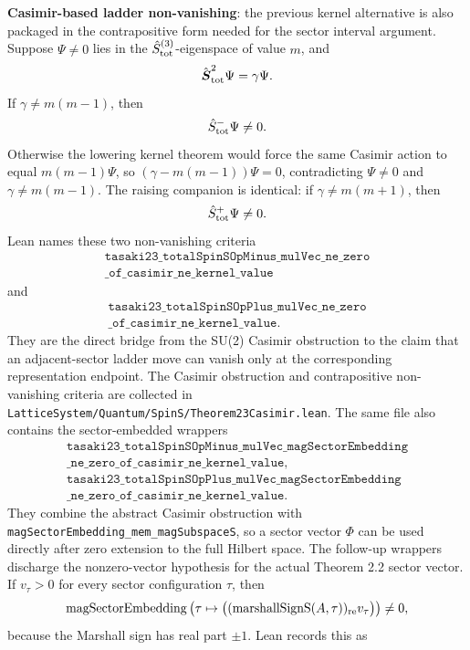 \documentclass[a4paper,11pt]{article}
\begin{document}
\textbf{Casimir-based ladder non-vanishing}: the previous kernel
alternative is also packaged in the contrapositive form needed for the
sector interval argument.  Suppose \(\Psi\ne0\) lies in the
\(\hat S^{(3)}_{\rm tot}\)-eigenspace of value \(m\), and
\[
  \hat{\boldsymbol S}_{\rm tot}^2\Psi=\gamma\Psi.
\]
If \(\gamma\ne m(m-1)\), then
\[
  \hat S^-_{\rm tot}\Psi\ne0.
\]
Otherwise the lowering kernel theorem would force the same Casimir
action to equal \(m(m-1)\Psi\), so
\((\gamma-m(m-1))\Psi=0\), contradicting \(\Psi\ne0\) and
\(\gamma\ne m(m-1)\).  The raising companion is identical: if
\(\gamma\ne m(m+1)\), then
\[
  \hat S^+_{\rm tot}\Psi\ne0.
\]
Lean names these two non-vanishing criteria
\[
\begin{gathered}
\texttt{tasaki23\_totalSpinSOpMinus\_mulVec\_ne\_zero}\\
\texttt{\_of\_casimir\_ne\_kernel\_value}
\end{gathered}
\]
and
\[
\begin{gathered}
\texttt{tasaki23\_totalSpinSOpPlus\_mulVec\_ne\_zero}\\
\texttt{\_of\_casimir\_ne\_kernel\_value}.
\end{gathered}
\]
They are the direct bridge from the SU(2) Casimir obstruction to the
claim that an adjacent-sector ladder move can vanish only at the
corresponding representation endpoint.  The Casimir obstruction and
contrapositive non-vanishing criteria are collected in
\texttt{LatticeSystem/Quantum/SpinS/Theorem23Casimir.lean}.
The same file also contains the sector-embedded wrappers
\[
\begin{gathered}
\texttt{tasaki23\_totalSpinSOpMinus\_mulVec\_magSectorEmbedding}\\
\texttt{\_ne\_zero\_of\_casimir\_ne\_kernel\_value},\\
\texttt{tasaki23\_totalSpinSOpPlus\_mulVec\_magSectorEmbedding}\\
\texttt{\_ne\_zero\_of\_casimir\_ne\_kernel\_value}.
\end{gathered}
\]
They combine the abstract Casimir obstruction with
\texttt{magSectorEmbedding\_mem\_magSubspaceS}, so a sector vector
\(\Phi\) can be used directly after zero extension to the full
Hilbert space.
The follow-up wrappers discharge the nonzero-vector hypothesis for the
actual Theorem 2.2 sector vector.  If \(v_\tau>0\) for every sector
configuration \(\tau\), then
\[
  \mathrm{magSectorEmbedding}
    \left(\tau\mapsto
      \bigl((\mathrm{marshallSignS}(A,\tau))_{\rm re} v_\tau\bigr)
    \right)\ne0,
\]
because the Marshall sign has real part \(\pm1\).  Lean records this as
\end{document}
